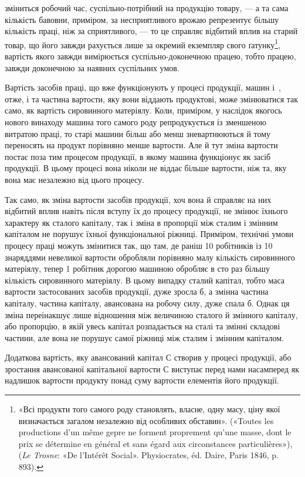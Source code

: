 \parcont{}  %
зміниться робочий час, суспільно-потрібний на продукцію товару, — а та сама кількість бавовни,
приміром, за несприятливого врожаю репрезентує більшу кількість праці, ніж за сприятливого,
— то це справляє відбитий вплив на старий товар, що його завжди рахується лише за окремий екземпляр
свого ґатунку\footnote{«Всі продукти того самого роду становлять, власне, одну масу, ціну якої визначається загалом
незалежно від особливих обставин». («Toutes les productions d’un même gepre ne forment proprement
qu’une masse, dont le prix se détermine en général et sans égard aux circonstances particulières»),
(\emph{Le Trosne}: «De l’Intérêt Social». Physiocrates, éd. Daire,
Paris 1846, p. 893).
},
вартість якого завжди вимірюється суспільно-доконечною працею, тобто працею, завжди доконечною за
наявних суспільних умов.

Вартість засобів праці, що вже функціонують у процесі продукції,
машин і~, отже, і та частина вартости, яку вони віддають продуктові, може змінюватися так
само, як вартість сировинного матеріялу. Коли, приміром, у наслідок якогось нового винаходу машина
того самого роду репродукується із зменшеною витратою праці, то старі машини більш або менш
зневартнюються
й тому переносять на продукт порівняно менше вартости. Але й тут зміна вартости постає поза тим
процесом продукції,
в якому машина функціонує як засіб продукції. В цьому процесі вона ніколи не віддає більше вартости,
ніж та, яку вона має незалежно від цього процесу.

Так само, як зміна вартости засобів продукції, хоч вона й справляє на них відбитий вплив навіть
після вступу їх до процесу продукції, не змінює їхнього характеру як сталого капіталу, так і зміна в
пропорції між сталим і змінним капіталом не порушує їхньої функціональної ріжниці. Приміром,
технічні умови процесу праці можуть змінитися так, що там, де раніш 10 робітників із 10 знаряддями
невеликої вартости обробляли порівняно малу кількість сировинного матеріялу, тепер 1 робітник
дорогою машиною обробляє в сто раз більшу кількість сировинного матеріялу. В цьому випадку сталий
капітал, тобто маса вартости застосованих
засобів продукції, дуже зросла б, а змінна частина капіталу, частина капіталу, авансована на робочу
силу, дуже спала б. Однак ця зміна переінакшує лише відношення між величиною сталого й змінного капіталу, або пропорцію,
в якій увесь капітал розпадається на сталі та змінні складові частини, але вона не
порушує самої ріжниці між сталим і змінним капіталом.


Додаткова вартість, яку авансований капітал $С$ створив у процесі продукції, або зростання авансованої
капітальної вартости $С$ виступає перед нами насамперед як надлишок вартости
продукту понад суму вартости елементів його продукції.
